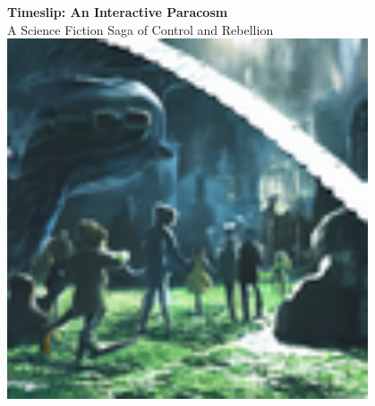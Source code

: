 \documentclass[10pt,letterpaper]{article}
\begin{document}
\begin{center}
{\Huge \textbf{Timeslip: An Interactive Paracosm}} \\
\vspace{0.2cm}
{\large A Science Fiction Saga of Control and Rebellion} \\
\vspace{0.3cm}
\includegraphics[width=0.8\textwidth]{title_image.jpg} %
\end{center}
\end{document}
